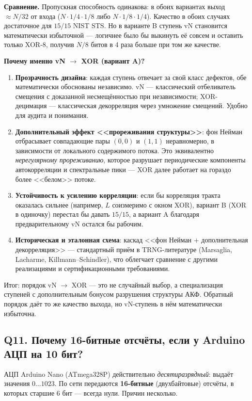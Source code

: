 \documentclass[12pt,a4paper]{extarticle}
\begin{document}
\medskip
\textbf{Сравнение.} Пропускная способность одинакова: в обоих вариантах
выход $\approx N/32$ от входа ($N\cdot 1/4 \cdot 1/8$ либо $N\cdot 1/8\cdot 1/4$).
Качество в обоих случаях достаточное для $15/15$ NIST STS. Но в варианте B
ступень vN становится математически избыточной --- логичнее было бы выкинуть
её совсем и оставить только XOR-8, получив $N/8$ битов в 4 раза больше при
том же качестве.

\medskip
\textbf{Почему именно vN $\to$ XOR (вариант A)?}
\begin{enumerate}
  \item \textbf{Прозрачность дизайна}: каждая ступень отвечает за свой
        класс дефектов, обе математически обоснованы независимо. vN ---
        классический отбеливатель смещения с доказанной несмещённостью при
        независимости; XOR-децимация --- классическая декорреляция через
        умножение смещений. Удобно для аудита и понимания.
  \item \textbf{Дополнительный эффект <<прореживания структуры>>}: фон
        Нейман отбрасывает совпадающие пары $(0,0)$ и $(1,1)$ неравномерно,
        в зависимости от локального содержимого потока. Это эквивалентно
        \emph{нерегулярному прореживанию}, которое разрушает периодические
        компоненты автокорреляции и спектральные пики --- XOR далее работает
        на гораздо более <<белом>> потоке.
  \item \textbf{Устойчивость к усилению корреляции}: если бы корреляция
        тракта оказалась сильнее (например, $L$ соизмеримо с окном XOR),
        вариант B (XOR в одиночку) перестал бы давать $15/15$, а вариант A
        благодаря предварительному vN остался бы рабочим.
  \item \textbf{Историческая и эталонная схема}: каскад <<фон Нейман $+$
        дополнительная декорреляция>> --- стандартный приём в TRNG-литературе
        (Marsaglia, Lacharme, Killmann--Schindler), что облегчает сравнение
        с другими реализациями и сертификационными требованиями.
\end{enumerate}

\medskip
Итог: порядок vN $\to$ XOR --- это не случайный выбор, а специализация
ступеней с дополнительным бонусом разрушения структуры АКФ. Обратный
порядок даёт то же качество выхода, но vN-ступень в нём математически
избыточна.

\subsection*{Q11. Почему 16-битные отсчёты, если у Arduino АЦП на 10 бит?}
АЦП Arduino Nano (ATmega328P) действительно \emph{десятиразрядный}:
выдаёт значения $0\ldots 1023$. По сети передаются \textbf{16-битные}
(двухбайтовые) отсчёты, в которых старшие $6$ бит --- всегда нули. Причин
несколько.
\end{document}

